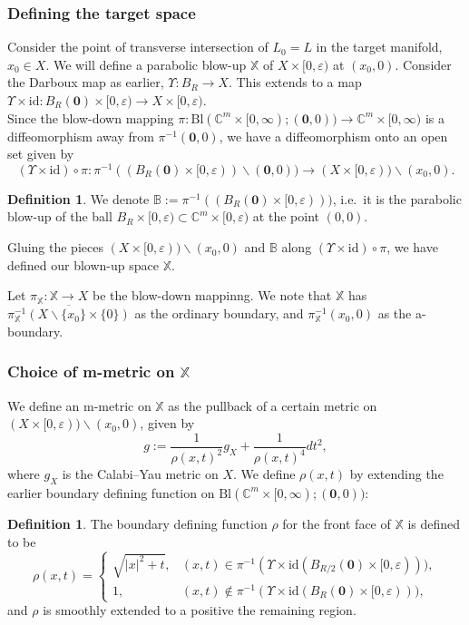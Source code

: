 \documentclass[10pt, a4paper]{article}
\theoremstyle{plain}%
\theoremstyle{definition}
\newtheorem{defn}[theorem]{Definition}
\numberwithin{figure}{section}
\numberwithin{equation}{section}
\newcommand{\bX}{\mathbb{X}}
\newcommand{\bC}{\mathbb{C}}
\newcommand{\bB}{\mathbb{B}}
\newcommand{\ep}{\varepsilon}
\newcommand{\Bl}{\mathrm{Bl}(\mathbb{C}^m\times[0,\infty); (\mathbf{0},0))}
\begin{document}
\subsubsection{Defining the target space}

Consider the point of transverse intersection of $L_0=L$ in the target manifold, $x_0\in X$. We will define a parabolic blow-up $\mathbb{X}$ of $X\times [0,\ep)$ at $(x_0,0)$. Consider the Darboux map as earlier, $\Upsilon: B_R\rightarrow X$. This extends to a map $\Upsilon\times \textrm{id} : B_R(\mathbf{0})\times [0,\ep)\rightarrow X\times [0,\ep)$. \\

Since the blow-down mapping $\pi: \Bl \rightarrow \mathbb{C}^m\times[0,\infty)$ is a diffeomorphism away from $\pi^{-1}(\mathbf{0},0)$,  we have a diffeomorphism onto an open set given by
\[ 
(\Upsilon\times \textrm{id}) \circ \pi : \pi^{-1}((B_R(\mathbf{0})\times [0,\ep))\backslash (\mathbf{0},0)) \rightarrow (X\times[0,\ep)) \backslash (x_0,0).
\]

\begin{defn}\label{def_ballblowup}
	We denote $\bB:= \pi^{-1}((B_R(\mathbf{0})\times [0,\ep)))$, i.e.\ it is the parabolic blow-up of the ball $B_R\times[0,\ep)\subset \bC^m\times[0,\ep)$ at the point $(0,0)$.
\end{defn} Gluing the pieces $(X\times[0,\ep)) \backslash (x_0,0)$ and $\bB$ along $(\Upsilon\times \textrm{id}) \circ \pi$, we have defined our blown-up space $\mathbb{X}$.

Let $\pi_\mathbb{X} : \mathbb{X} \rightarrow X$ be the blow-down mappinng. We note that $\mathbb{X}$ has $\overline{\pi_\mathbb{X}^{-1}(X\backslash \{x_0\}\times \{0\})}$ as the ordinary boundary, and $\pi_\mathbb{X}^{-1}(x_0,0)$ as the a-boundary. 

\subsubsection{Choice of m-metric on $\mathbb{X}$}
We define an m-metric on $\mathbb{X}$ as the pullback of a certain metric on $(X\times[0,\ep)) \backslash (x_0,0)$, given by 
\begin{equation}\label{eq_bmetric}
g := \frac{1}{\rho (x,t)^2}g_X + \frac{1}{\rho(x,t)^4}dt^2,
\end{equation}
where $g_X$ is the Calabi--Yau metric on $X$. We define $\rho(x,t)$ by extending the earlier boundary defining function on $\Bl$:
\begin{defn}
    The boundary defining function $\rho$ for the front face of $\bX$ is defined to be
    \[
	\rho(x,t)= \begin{cases}
		\sqrt{|x|^2+t}, & (x,t)\in \pi^{-1}(\Upsilon\times \mathrm{id} (B_{R/2}(\mathbf{0})\times[0,\ep))), \\
		1, & (x,t) \not\in \pi^{-1}(\Upsilon\times \mathrm{id} (B_{R}(\mathbf{0})\times[0,\ep))),
	\end{cases}
	\]
 and $\rho$ is smoothly extended to a positive the remaining region.
\end{defn}
\end{document}

